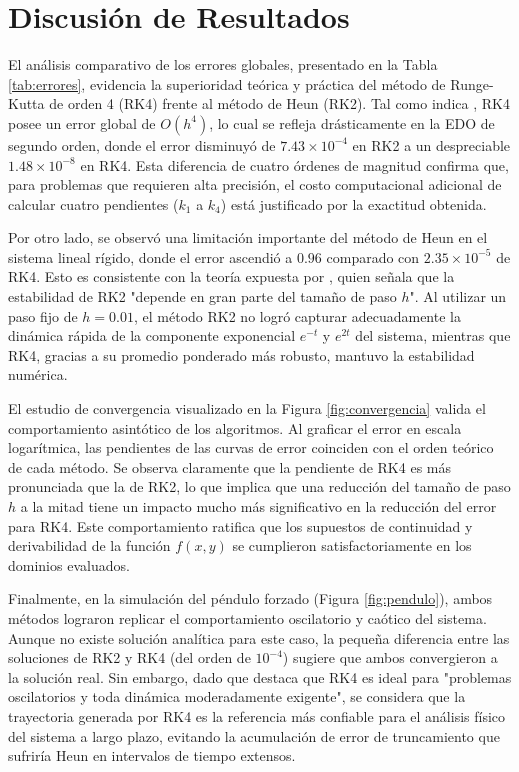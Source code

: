 	\section{Discusión de Resultados}
	
	El análisis comparativo de los errores globales, presentado en la Tabla \ref{tab:errores}, evidencia la superioridad teórica y práctica del método de Runge-Kutta de orden 4 (RK4) frente al método de Heun (RK2). Tal como indica \textcite{zill2018}, RK4 posee un error global de $O(h^4)$, lo cual se refleja drásticamente en la EDO de segundo orden, donde el error disminuyó de $7.43 \times 10^{-4}$ en RK2 a un despreciable $1.48 \times 10^{-8}$ en RK4. Esta diferencia de cuatro órdenes de magnitud confirma que, para problemas que requieren alta precisión, el costo computacional adicional de calcular cuatro pendientes ($k_1$ a $k_4$) está justificado por la exactitud obtenida.
	
	\vspace{0.5cm}
	
	Por otro lado, se observó una limitación importante del método de Heun en el sistema lineal rígido, donde el error ascendió a $0.96$ comparado con $2.35 \times 10^{-5}$ de RK4. Esto es consistente con la teoría expuesta por \textcite{zill2018}, quien señala que la estabilidad de RK2 "depende en gran parte del tamaño de paso $h$". Al utilizar un paso fijo de $h=0.01$, el método RK2 no logró capturar adecuadamente la dinámica rápida de la componente exponencial $e^{-t}$ y $e^{2t}$ del sistema, mientras que RK4, gracias a su promedio ponderado más robusto, mantuvo la estabilidad numérica.
	
	\vspace{0.5cm}
	
	El estudio de convergencia visualizado en la Figura \ref{fig:convergencia} valida el comportamiento asintótico de los algoritmos. Al graficar el error en escala logarítmica, las pendientes de las curvas de error coinciden con el orden teórico de cada método. Se observa claramente que la pendiente de RK4 es más pronunciada que la de RK2, lo que implica que una reducción del tamaño de paso $h$ a la mitad tiene un impacto mucho más significativo en la reducción del error para RK4. Este comportamiento ratifica que los supuestos de continuidad y derivabilidad de la función $f(x,y)$ se cumplieron satisfactoriamente en los dominios evaluados.
	
	\vspace{0.5cm}
	
	Finalmente, en la simulación del péndulo forzado (Figura \ref{fig:pendulo}), ambos métodos lograron replicar el comportamiento oscilatorio y caótico del sistema. Aunque no existe solución analítica para este caso, la pequeña diferencia entre las soluciones de RK2 y RK4 (del orden de $10^{-4}$) sugiere que ambos convergieron a la solución real. Sin embargo, dado que \textcite{zill2018} destaca que RK4 es ideal para "problemas oscilatorios y toda dinámica moderadamente exigente", se considera que la trayectoria generada por RK4 es la referencia más confiable para el análisis físico del sistema a largo plazo, evitando la acumulación de error de truncamiento que sufriría Heun en intervalos de tiempo extensos.
	
